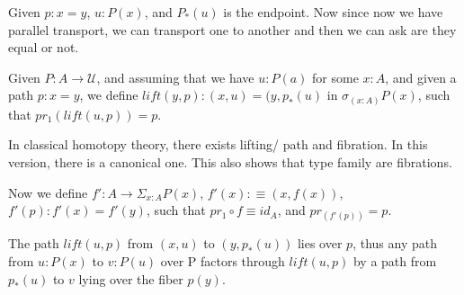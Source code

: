 \documentclass[12pt]{article}%
\theoremstyle{definition}
\theoremstyle{remark}
\theoremstyle{definition}
\theoremstyle{definition}
\begin{document}

Given $p: x = y$, $u : P(x)$, and $P_*(u)$ is the endpoint. Now since now we have parallel transport, we can transport one to another and then we can ask are they equal or not.

Given $P: A \rightarrow \mathcal{U}$, and assuming that we have $u : P(a)$ for some $x : A$, and given a path $p : x = y$, we define $lift(y,p): (x,u) = (y, p_*(u)$ in $\sigma_{(x: A)} P(x)$, such that $pr_1(lift(u,p)) = p$.

In classical homotopy theory, there exists lifting/ path and fibration. In this version, there is a canonical one. This also shows that type family are fibrations.

Now we define $f': A \rightarrow \Sigma_{x:A} P(x)$, $f'(x) :\equiv (x, f(x))$, $f'(p): f'(x) = f'(y)$, such that $pr_1 \circ f \equiv id_A$, and $pr_ (f'(p)) = p$.

The path $lift(u,p)$ from $(x,u)$ to $(y, p_*(u))$ lies over $p$, thus any path from $u:P(x)$ to $v : P(u)$ over P factors through $lift(u,p)$ by a path from $p_*(u)$ to $v$ lying over the fiber $p(y)$.



\listoftodos
\end{document}
